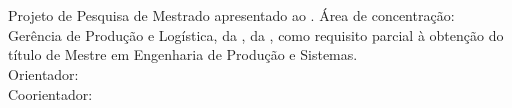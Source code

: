 \begin{center}
    {\singlespacing
    \MakeUppercase{\textbf{\aluno}} \\ [5cm]

    \MakeUppercase{\titulo}\\ [1cm]
    
    \hspace{.45\textwidth} %
        \begin{minipage}{.5\textwidth}
        \noindent Projeto de Pesquisa de Mestrado apresentado ao \curso. Área de concentração: Gerência de Produção e Logística, da \departamento, da \universidade, como requisito parcial à obtenção do título de Mestre em Engenharia de Produção e Sistemas.\\ [5mm]
        \noindent Orientador: \orientador\\
        \noindent Coorientador: \coorientador
        \end{minipage}
    
    \vfill
    
    \MakeUppercase{\cidade} \\ 
    \ano}
\end{center}